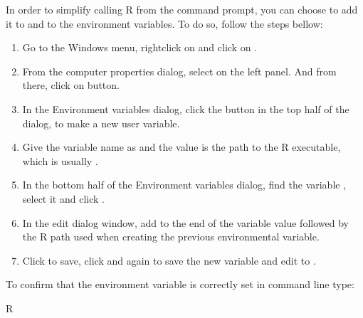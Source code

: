 \documentclass[letterpaper,10pt,english]{sphinxmanual}
\begin{document}
In order to simplify calling R from the command prompt, you can choose to add it to  and to the environment variables. To do so, follow the steps bellow:
\begin{enumerate}
%
\item {} 
Go to the Windows menu, right\sphinxhyphen{}click on  and click on .

\item {} 
From the computer properties dialog, select  on the left panel. And from there, click on  button.

\item {} 
In the Environment variables dialog, click the  button in the top half of the dialog, to make a new user variable.

\item {} 
Give the variable name as  and the value is the path to the R executable, which is usually .

\item {} 
In the bottom half of the Environment variables dialog, find the variable , select it and click .

\item {} 
In the edit dialog window, add \sphinxcode{\sphinxupquote{;}} to the end of the variable value followed by the R path used when creating the previous environmental variable.

\item {} 
Click  to save, click  and  again to save the new variable and edit to .

\end{enumerate}

To confirm that the environment variable is correctly set in command line type:

\begin{sphinxVerbatim}[commandchars=\\\{\}]
\PYGZgt{}  \PYGZpc{}R\PYGZpc{}
\end{sphinxVerbatim}
\end{document}
